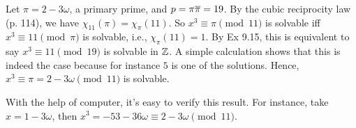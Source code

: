 \documentclass[../I&R.tex]{subfiles}
\begin{document}
Let $\pi=2-3\omega$, a primary prime, and $p=\pi\overline{\pi}=19$. By the cubic reciprocity law (p. 114), we have $\chi_{11}(\pi)=\chi_\pi(11)$. So $x^3\equiv\pi\pmod{11}$ is solvable iff $x^3\equiv11\pmod{\pi}$ is solvable, i.e., $\chi_\pi(11)=1$. By Ex 9.15, this is equivalent to say $x^3\equiv11\pmod{19}$ is solvable in $\mathbb{Z}$. A simple calculation shows that this is indeed the case because for instance $5$ is one of the solutions. Hence, $x^3\equiv\pi=2-3\omega\pmod{11}$ is solvable.

With the help of computer, it's easy to verify this result. For instance, take $x=1-3\omega$, then $x^3=-53-36\omega\equiv2-3\omega\pmod{11}$.

\begin{comment}

\subsection*{Exercise 9.17}

By Ex 9.2, we may write $\gamma=\pm\omega^b\lambda^c\gamma_1\cdots\gamma_t$ where $\gamma_i$ is a primary prime for all $i$. So $2\equiv\gamma\equiv\pm\omega^b\lambda^c2^t\pmod{3}$. This implies $\omega^b\lambda^c\equiv1,2\pmod{3}$. Note that since $\lambda^2=-3\omega\equiv0\pmod{3}$, we have $c=0,1$. So we only need to check six cases, namely, $(b,c)=(0,0),(1,0),(2,0),(0,1),(1,1),(2,1)$. These correspond to $\omega^b\lambda^c=1,\omega,\omega^2,\lambda,\omega\lambda,\omega^2\lambda$, respectively.

Since $a+b\omega\equiv1,2\pmod{3}$ is equivalent to $a\equiv1,2\pmod{3}$ and $b\equiv0\pmod{3}$, it's easy to check that the only possible case is $(b,c)=(0,0)$. This implies $\gamma=\pm\gamma_1\cdots\gamma_t$ and so we are done.

\subsection*{Exercise 9.18}

Note that if $\alpha\equiv\beta\pmod{\gamma}$, then $\alpha\equiv\beta\pmod{\gamma_i}$ for all $i=1,\ldots,t$. So $\chi_\gamma(\alpha) \overset{\df}{=} \prod_{i=1}^t \chi_{\gamma_i}(\alpha) = \prod_{i=1}^t \chi_{\gamma_i}(\beta) \overset{\df}{=} \chi_\gamma(\beta)$. Also, $\chi_\gamma(\alpha\beta) \overset{\df}{=} \prod_{i=1}^t \chi_{\gamma_i}(\alpha\beta) = \prod_{i=1}^t \chi_{\gamma_i}(\alpha)\chi_{\gamma_i}(\beta) = \prod_{i=1}^t \chi_{\gamma_i}(\alpha)\prod_{i=1}^t \chi_{\gamma_i}(\beta) \overset{\df}{=} \chi_\gamma(\alpha)\chi_\gamma(\beta)$.

If $\rho=\pm\rho_1\cdots\rho_s$ is a primary decomposition of $\rho$, then $-\rho\gamma=\pm(\rho_1\cdots\rho_s\gamma_1\cdots\gamma_t)$ is a primary decomposition of $-\rho\gamma$. So $\chi_\rho(\alpha)\chi_\gamma(\alpha) \overset{\df}{=} \prod_{j=1}^s \chi_{\rho_j}(\alpha)\prod_{i=1}^t \chi_{\gamma_i}(\alpha) \overset{\df}{=} \chi_{-\rho\gamma}(\alpha)$.

\end{comment}
\end{document}
